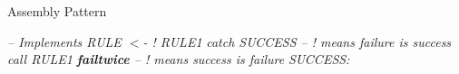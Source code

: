 Assembly Pattern

\begin{myquote}
\textit{-- Implements RULE $<$- ! RULE1} \newline
\textit{catch SUCCESS -- ! means failure is success} \newline
\textit{call RULE1} \newline
\textit{\textbf{failtwice} -- ! means success is failure} \newline
\textit{SUCCESS:} \newline
\end{myquote}

